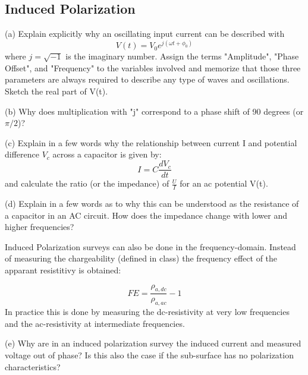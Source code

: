 \subsection{Induced Polarization}
(a) Explain explicitly why an oscillating input current can be described with 
$$
V(t) = V_0e^{j(\omega t+\phi_0)}
$$ 
where $j=\sqrt{-1}$ is the imaginary number. Assign the terms "Amplitude", "Phase Offset", and "Frequency" to the variables involved and memorize that those three parameters are always required to describe any type of waves and oscillations. Sketch the real part of V(t).

(b) Why does multiplication with "j" correspond to a phase shift of 90 degrees (or $\pi/2$)? 

(c) Explain in a few words why the relationship  between current I and potential difference $V_c$ across a capacitor is given by:
$$
I = C\frac{dV_c}{dt}
$$
and calculate the ratio (or the impedance) of $\frac{U}{I}$ for an ac potential V(t). 

(d) Explain in a few words as to why this can be understood as the resistance of a capacitor in an AC circuit. How does the impedance change with lower and higher frequencies? 

Induced Polarization surveys can also be done in the frequency-domain. Instead of measuring the chargeability (defined in class) the frequency effect of the apparant resistitivy is obtained:

$$
FE = \frac{\rho_{a,dc}}{\rho_{a,ac}} - 1
$$
In practice this is done by measuring the dc-resistivity at very low frequencies and the ac-resistivity at intermediate frequencies. 

(e) Why are in an induced polarization survey the induced current and measured voltage out of phase? Is this also the case if the sub-surface has no polarization characteristics?


